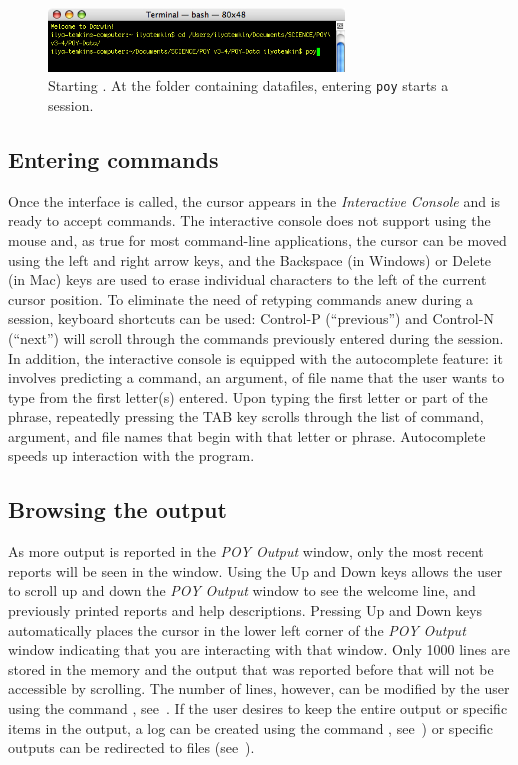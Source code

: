 \begin{figure}[htbp]
   \centering
   \includegraphics[width=0.7\textwidth]{doc/figures/figprelim2.jpg}
   \caption{Starting \poy. At the folder containing datafiles, entering \texttt{poy} starts a \poy session.}
   \label{fig:figprelim2}
\end{figure}

\subsection{Entering commands}
Once the \poy interface is called, the cursor appears in the \emph{Interactive Console} and \poy is ready to accept commands. The interactive console does not support using the mouse and, as true for most command-line applications, the cursor can be moved using the left and right arrow keys, and the Backspace (in Windows) or Delete (in Mac) keys are used to erase individual characters to the left of the current cursor position. To eliminate the need of retyping commands anew during a \poy session, keyboard shortcuts can be used: Control-P (``previous'') and Control-N (``next'') will scroll through the commands previously entered during the session. In addition, the interactive console is equipped with the autocomplete feature: it involves \poy predicting a command, an argument, of file name that the user wants to type from the first letter(s) entered. Upon typing the first letter or part of the phrase, repeatedly pressing the TAB key scrolls through the list of command, argument, and file names that begin with that letter or phrase. Autocomplete speeds up interaction with the program.

\subsection{Browsing the output}
As more output is reported in the \emph{POY Output} window, only the most recent reports will be seen in the window. Using the Up and Down keys allows the user to scroll up and down the \emph{POY Output} window to see the welcome line, and previously printed reports and help descriptions. Pressing Up and Down keys automatically places the cursor in the lower left corner of the \emph{POY Output} window indicating that you are interacting with that window. Only 1000 lines are stored in the memory and the output that was reported before that will not be accessible by scrolling. The number of lines, however, can be modified by the user using the command , see~. If the user desires to keep the entire output or specific items in the output, a log can be created using the command , see~) or specific outputs can be redirected to files (see~).

